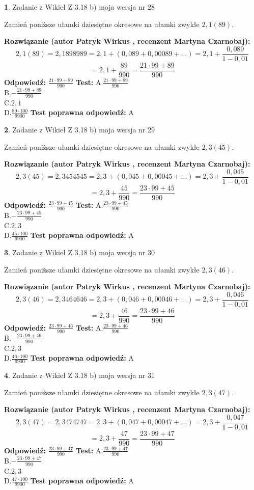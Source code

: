 \documentclass[12pt, a4paper]{article}
\theoremstyle{definition} %
\newtheorem{zad}{}
\newcommand{\zadStart}[1]{\begin{zad}#1\newline}
\newcommand{\zadStop}{\end{zad}}
\newcommand{\rozwStart}[2]{\noindent \textbf{Rozwiązanie (autor #1 , recenzent #2): }\newline}
\newcommand{\rozwStop}{\newline}
\newcommand{\odpStart}{\noindent \textbf{Odpowiedź:}\newline}
\newcommand{\odpStop}{\newline}
\newcommand{\testStart}{\noindent \textbf{Test:}\newline}
\newcommand{\testStop}{\newline}
\newcommand{\kluczStart}{\noindent \textbf{Test poprawna odpowiedź:}\newline}
\newcommand{\kluczStop}{\newline}
\begin{document}
\zadStart{Zadanie z Wikieł Z 3.18 b) moja wersja nr 28}

Zamień poniższe ułamki dziesiętne okresowe na ułamki zwykłe $2,1(89)$.
\zadStop
\rozwStart{Patryk Wirkus}{Martyna Czarnobaj}
$$2,1(89)=2,1898989=2,1+(0,089+0,00089+...)=2,1+\frac{0,089}{1-0,01}$$
$$=2,1+\frac{89}{990}=\frac{21\cdot99+89}{990}$$
\rozwStop
\odpStart
$\frac{21\cdot99+89}{990}$
\odpStop
\testStart
A.$\frac{21\cdot99+89}{990}$\\ B.$-\frac{21\cdot99+89}{990}$\\ C.$2,1$\\ D.$\frac{89\cdot100}{9900}$
\testStop
\kluczStart
A
\kluczStop



\zadStart{Zadanie z Wikieł Z 3.18 b) moja wersja nr 29}

Zamień poniższe ułamki dziesiętne okresowe na ułamki zwykłe $2,3(45)$.
\zadStop
\rozwStart{Patryk Wirkus}{Martyna Czarnobaj}
$$2,3(45)=2,3454545=2,3+(0,045+0,00045+...)=2,3+\frac{0,045}{1-0,01}$$
$$=2,3+\frac{45}{990}=\frac{23\cdot99+45}{990}$$
\rozwStop
\odpStart
$\frac{23\cdot99+45}{990}$
\odpStop
\testStart
A.$\frac{23\cdot99+45}{990}$\\ B.$-\frac{23\cdot99+45}{990}$\\ C.$2,3$\\ D.$\frac{45\cdot100}{9900}$
\testStop
\kluczStart
A
\kluczStop



\zadStart{Zadanie z Wikieł Z 3.18 b) moja wersja nr 30}

Zamień poniższe ułamki dziesiętne okresowe na ułamki zwykłe $2,3(46)$.
\zadStop
\rozwStart{Patryk Wirkus}{Martyna Czarnobaj}
$$2,3(46)=2,3464646=2,3+(0,046+0,00046+...)=2,3+\frac{0,046}{1-0,01}$$
$$=2,3+\frac{46}{990}=\frac{23\cdot99+46}{990}$$
\rozwStop
\odpStart
$\frac{23\cdot99+46}{990}$
\odpStop
\testStart
A.$\frac{23\cdot99+46}{990}$\\ B.$-\frac{23\cdot99+46}{990}$\\ C.$2,3$\\ D.$\frac{46\cdot100}{9900}$
\testStop
\kluczStart
A
\kluczStop



\zadStart{Zadanie z Wikieł Z 3.18 b) moja wersja nr 31}

Zamień poniższe ułamki dziesiętne okresowe na ułamki zwykłe $2,3(47)$.
\zadStop
\rozwStart{Patryk Wirkus}{Martyna Czarnobaj}
$$2,3(47)=2,3474747=2,3+(0,047+0,00047+...)=2,3+\frac{0,047}{1-0,01}$$
$$=2,3+\frac{47}{990}=\frac{23\cdot99+47}{990}$$
\rozwStop
\odpStart
$\frac{23\cdot99+47}{990}$
\odpStop
\testStart
A.$\frac{23\cdot99+47}{990}$\\ B.$-\frac{23\cdot99+47}{990}$\\ C.$2,3$\\ D.$\frac{47\cdot100}{9900}$
\testStop
\kluczStart
A
\kluczStop
\end{document}
